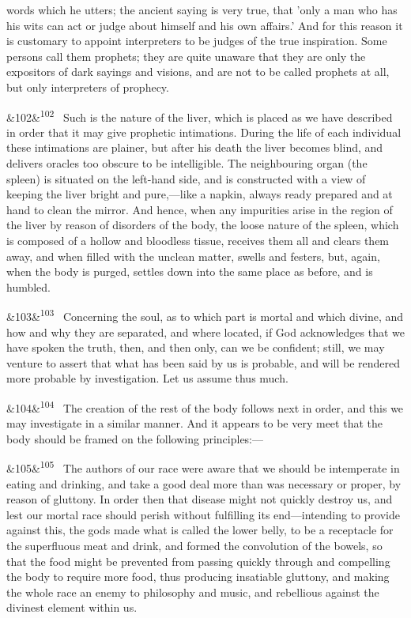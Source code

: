 \documentclass[12pt]{article}
\newcommand{\para}[1][]{\par\noindent\ifx&#1&\else\textsuperscript{\footnotesize #1}~\fi}
\begin{document}
words which he utters; the ancient saying is very true, that 'only a man who has his wits can act or judge about himself and his own affairs.' And for this reason it is customary to appoint interpreters to be judges of the true inspiration. Some persons call them prophets; they are quite unaware that they are only the expositors of dark sayings and visions, and are not to be called prophets at all, but only interpreters of prophecy.

\para[102] Such is the nature of the liver, which is placed as we have described in order that it may give prophetic intimations. During the life of each individual these intimations are plainer, but after his death the liver becomes blind, and delivers oracles too obscure to be intelligible. The neighbouring organ (the spleen) is situated on the left-hand side, and is constructed with a view of keeping the liver bright and pure,---like a napkin, always ready prepared and at hand to clean the mirror. And hence, when any impurities arise in the region of the liver by reason of disorders of the body, the loose nature of the spleen, which is composed of a hollow and bloodless tissue, receives them all and clears them away, and when filled with the unclean matter, swells and festers, but, again, when the body is purged, settles down into the same place as before, and is humbled.

\para[103] Concerning the soul, as to which part is mortal and which divine, and how and why they are separated, and where located, if God acknowledges that we have spoken the truth, then, and then only, can we be confident; still, we may venture to assert that what has been said by us is probable, and will be rendered more probable by investigation. Let us assume thus much.

\para[104] The creation of the rest of the body follows next in order, and this we may investigate in a similar manner. And it appears to be very meet that the body should be framed on the following principles:---

\para[105] The authors of our race were aware that we should be intemperate in eating and drinking, and take a good deal more than was necessary or proper, by reason of gluttony. In order then that disease might not quickly destroy us, and lest our mortal race should perish without fulfilling its end---intending to provide against this, the gods made what is called the lower belly, to be a receptacle for the superfluous meat and drink, and formed the convolution of the bowels, so that the food might be prevented from passing quickly through and compelling the body to require more food, thus producing insatiable gluttony, and making the whole race an enemy to philosophy and music, and rebellious against the divinest element within us.
\end{document}
